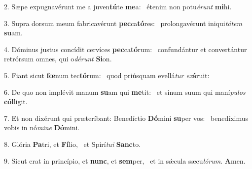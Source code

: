 2. Sæpe expugnavérunt me a juven\textbf{tú}te \textbf{me}a: \ast\  étenim non potu\textit{é}\textit{runt} \textbf{mi}hi.\

3. Supra dorsum meum fabricavérunt \textbf{pec}ca\textbf{tó}res: \ast\  prolongavérunt iniqui\textit{tá}\textit{tem} \textbf{su}am.\

4. Dóminus justus concídit cervíces \textbf{pec}ca\textbf{tó}rum: \ast\  confundántur et convertántur retrórsum omnes, qui o\textit{dé}\textit{runt} \textbf{Si}on.\

5. Fiant sicut \textbf{fœ}num tec\textbf{tó}rum: \ast\  quod priúsquam evellá\textit{tur} \textit{ex}\textbf{á}ruit:\

6. De quo non implévit manum \textbf{su}am qui \textbf{me}tit: \ast\  et sinum suum qui maní\textit{pu}\textit{los} \textbf{cól}ligit.\

7. Et non dixérunt qui præteríbant: Benedíctio \textbf{Dó}mini \textbf{su}per vos: \ast\  benedíximus vobis in nó\textit{mi}\textit{ne} \textbf{Dó}mini.\

8. Glória \textbf{Pa}tri, et \textbf{Fí}lio, \ast\  et Spirí\textit{tu}\textit{i} \textbf{Sanc}to.\

9. Sicut erat in princípio, et \textbf{nunc}, et \textbf{sem}per, \ast\  et in sǽcula sæcu\textit{ló}\textit{rum}. \textbf{A}men.\

